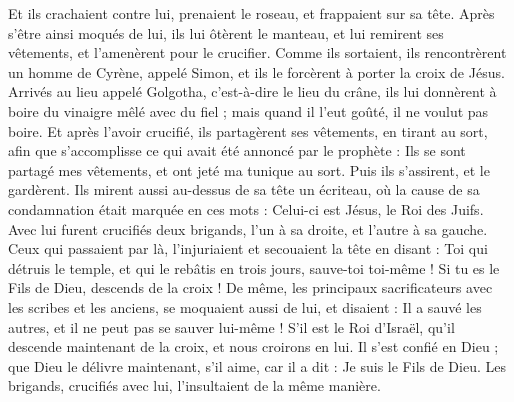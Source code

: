 \begin{multicols}{2}
Et ils crachaient contre lui, prenaient le roseau, et frappaient sur sa tête.
Après s'être ainsi moqués de lui, ils lui ôtèrent le manteau, et lui remirent ses vêtements, et l'amenèrent pour le crucifier.
Comme ils sortaient, ils rencontrèrent un homme de Cyrène, appelé Simon, et ils le forcèrent à porter la croix de Jésus.
Arrivés au lieu appelé Golgotha, c'est-à-dire le lieu du crâne,
ils lui donnèrent à boire du vinaigre mêlé avec du fiel{} ; mais quand il l’eut goûté, il ne voulut pas boire.
Et après l'avoir crucifié, ils partagèrent ses vêtements, en tirant au sort, afin que s’accomplisse ce qui avait été annoncé par le prophète : Ils se sont partagé mes vêtements, et ont jeté ma tunique au sort{}.
Puis ils s’assirent, et le gardèrent.
Ils mirent aussi au-dessus de sa tête un écriteau, où la cause de sa condamnation était marquée en ces mots : Celui-ci est Jésus, le Roi des Juifs.
Avec lui furent crucifiés deux brigands, l'un à sa droite, et l'autre à sa gauche.
Ceux qui passaient par là, l’injuriaient et secouaient la tête
en disant : Toi qui détruis le temple, et qui le rebâtis en trois jours, sauve-toi toi-même ! Si tu es le Fils de Dieu, descends de la croix !
De même, les principaux sacrificateurs avec les scribes et les anciens, se moquaient aussi de lui, et disaient :
Il a sauvé les autres, et il ne peut pas se sauver lui-même ! S’il est le Roi d'Israël, qu'il descende maintenant de la croix, et nous croirons en lui.
Il s’est confié en Dieu ; que Dieu le délivre maintenant, s’il aime, car il a dit : Je suis le Fils de Dieu.
Les brigands, crucifiés avec lui, l’insultaient de la même manière.

\end{multicols}
